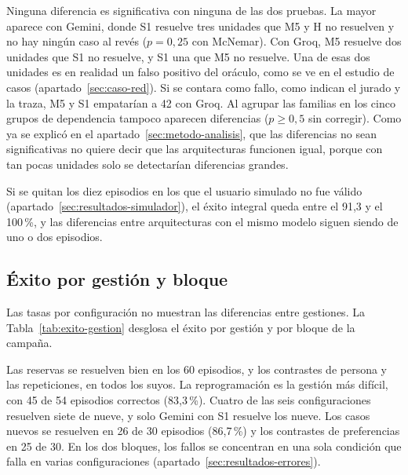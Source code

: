 Ninguna diferencia es significativa con ninguna de las dos pruebas. La mayor
aparece con Gemini, donde S1 resuelve tres unidades que M5 y H no resuelven y no
hay ningún caso al revés ($p=0{,}25$ con McNemar). Con Groq, M5 resuelve dos
unidades que S1 no resuelve, y S1 una que M5 no resuelve. Una de esas dos
unidades es en realidad un falso positivo del oráculo, como se ve en el estudio
de casos (apartado~\ref{sec:caso-red}). Si se contara como fallo, como indican
el jurado y la traza, M5 y S1 empatarían a 42 con Groq. Al agrupar las familias
en los cinco grupos de dependencia tampoco aparecen diferencias ($p\geq0{,}5$
sin corregir). Como ya se explicó en el apartado~\ref{sec:metodo-analisis}, que
las diferencias no sean significativas no quiere decir que las arquitecturas
funcionen igual, porque con tan pocas unidades solo se detectarían diferencias
grandes.

Si se quitan los diez episodios en los que el usuario simulado no fue válido
(apartado~\ref{sec:resultados-simulador}), el éxito integral queda entre el
91,3 y el 100\,\%, y las diferencias entre arquitecturas con el mismo modelo
siguen siendo de uno o dos episodios.

\subsection{Éxito por gestión y bloque}
\label{sec:resultados-gestion}

Las tasas por configuración no muestran las diferencias entre gestiones. La
Tabla~\ref{tab:exito-gestion} desglosa el éxito por gestión y por bloque de la
campaña.

\begin{table}[!htbp]
\centering
\small
\caption[Éxito integral por gestión y bloque.]{Éxito integral por gestión y
bloque de la campaña (episodios correctos sobre episodios).}
\label{tab:exito-gestion}

\end{table}

Las reservas se resuelven bien en los 60 episodios, y los contrastes de persona
y las repeticiones, en todos los suyos. La reprogramación es la gestión más
difícil, con 45 de 54 episodios correctos (83,3\,\%). Cuatro de las seis
configuraciones resuelven siete de nueve, y solo Gemini con S1 resuelve los
nueve. Los casos nuevos se resuelven en 26 de 30 episodios (86,7\,\%) y los
contrastes de preferencias en 25 de 30. En los dos bloques, los fallos se
concentran en una sola condición que falla en varias configuraciones
(apartado~\ref{sec:resultados-errores}).

